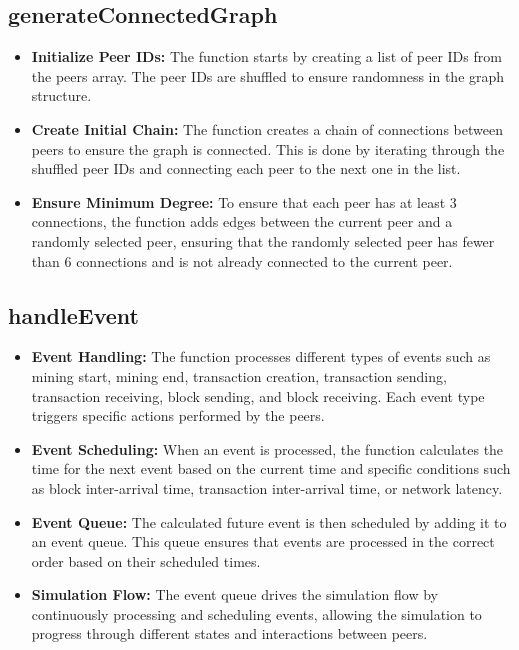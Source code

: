 \documentclass[a4paper,12pt]{article}
\begin{document}
\subsection*{generateConnectedGraph}

\begin{itemize}
    \item \textbf{Initialize Peer IDs:} The function starts by creating a list of peer IDs from the peers array. The peer IDs are shuffled to ensure randomness in the graph structure.
    \item \textbf{Create Initial Chain:} The function creates a chain of connections between peers to ensure the graph is connected. This is done by iterating through the shuffled peer IDs and connecting each peer to the next one in the list.
    \item \textbf{Ensure Minimum Degree:} To ensure that each peer has at least 3 connections, the function adds edges between the current peer and a randomly selected peer, ensuring that the randomly selected peer has fewer than 6 connections and is not already connected to the current peer.
\end{itemize}

\subsection*{handleEvent}

\begin{itemize}
    \item \textbf{Event Handling:} The function processes different types of events such as mining start, mining end, transaction creation, transaction sending, transaction receiving, block sending, and block receiving. Each event type triggers specific actions performed by the peers.
    \item \textbf{Event Scheduling:} When an event is processed, the function calculates the time for the next event based on the current time and specific conditions such as block inter-arrival time, transaction inter-arrival time, or network latency.
    \item \textbf{Event Queue:} The calculated future event is then scheduled by adding it to an event queue. This queue ensures that events are processed in the correct order based on their scheduled times.
    \item \textbf{Simulation Flow:} The event queue drives the simulation flow by continuously processing and scheduling events, allowing the simulation to progress through different states and interactions between peers.
\end{itemize}
\end{document}
